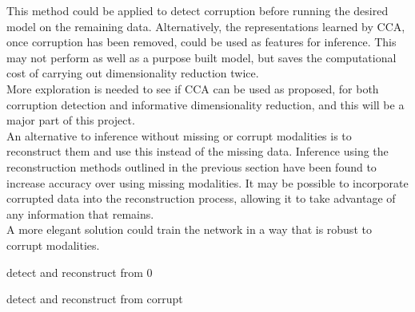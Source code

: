 This method could be applied to detect corruption before running the desired model on the remaining data. Alternatively, the representations learned by CCA, once corruption has been removed, could be used as features for inference. This may not perform as well as a purpose built model, but saves the computational cost of carrying out dimensionality reduction twice.\\

More exploration is needed to see if CCA can be used as proposed, for both corruption detection and informative dimensionality reduction, and this will be a major part of this project.\\

An alternative to inference without missing or corrupt modalities is to reconstruct them and use this instead of the missing data. Inference using the reconstruction methods outlined in the previous section have been found to increase accuracy over using missing modalities. It may be possible to incorporate corrupted data into the reconstruction process, allowing it to take advantage of any information that remains.\\

A more elegant solution could train the network in a way that is robust to corrupt modalities. 

detect and reconstruct from 0

detect and reconstruct from corrupt
